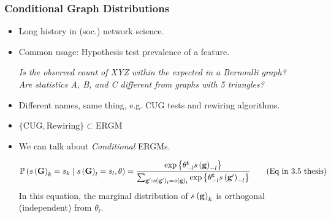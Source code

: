 \documentclass[aspectratio=169, 9pt]{beamer}
\begin{document}
\begin{frame}
	\frametitle{Conditional Graph Distributions}
	
	\begin{itemize}
		\item Long history in (soc.) network science.\pause
		\item Common usage: Hypothesis test prevalence of a feature.\pause{}
		\begin{center}\it
			Is the observed count of XYZ within the expected in a \alert{Bernoulli graph}? \\ \pause{}
			Are statistics A, B, and C different from \alert{graphs with 5 triangles}?
		\end{center}
		\item Different names, same thing, e.g. CUG tests and rewiring algorithms.\pause
		\item $\{\mbox{CUG}, \mbox{Rewiring}\}\subset \mbox{ERGM}$\pause
		\item We can talk about \textit{Conditional} ERGMs.
		
		\begin{equation*}
		\Prcond{\sufstats{\Graph}_k = s_k}{\sufstats{\Graph}_l = s_l, \theta} = %
		\frac{%
			\exp{\transpose{\theta}_{-l}\sufstats{\graph}_{-l}}
		}{%
			\sum_{\graph': \sufstats{\graph'}_l = \sufstats{\graph}_l}\exp{\transpose{\theta}_{-l}\sufstats{\graph'}_{-l}}
		}\tag{Eq in 3.5 thesis}
		\end{equation*}
		\pause In this equation, the marginal distribution of $s\left(\mathbf{g}\right)_k$ is orthogonal (independent) from $\theta_l$.
		
		
	\end{itemize}
	
	\vfill\hfill\hyperlink{discrete-exponential}{}
	
\end{frame}
\end{document}
